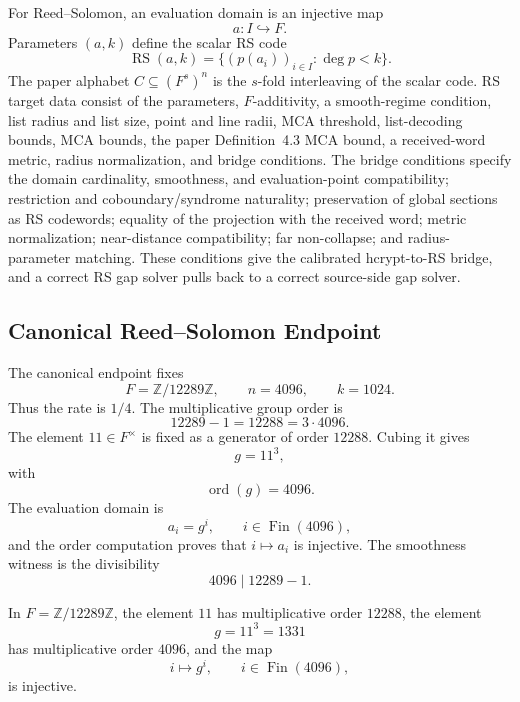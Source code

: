 For Reed--Solomon, an evaluation domain is an injective map
\[
  a:I\hookrightarrow F.
\]
Parameters \((a,k)\) define the scalar RS code
\[
  \operatorname{RS}(a,k)
  =
  \{(p(a_i))_{i\in I}:\deg p<k\}.
\]
The paper alphabet \(C\subseteq(F^s)^n\) is the \(s\)-fold interleaving of the
scalar code. RS target data consist of the parameters, \(F\)-additivity, a
smooth-regime condition, list radius and list size, point and line radii, MCA
threshold, list-decoding bounds, MCA bounds, the paper Definition~4.3 MCA
bound, a received-word metric, radius normalization, and bridge conditions.
The bridge conditions specify the domain cardinality, smoothness, and
evaluation-point compatibility; restriction and coboundary/syndrome
naturality; preservation of global sections as RS codewords; equality of the
projection with the received word; metric normalization; near-distance
compatibility; far non-collapse; and radius-parameter matching.
These conditions give the calibrated hcrypt-to-RS bridge, and a correct
RS gap solver pulls back to a correct source-side gap solver.

\subsection{Canonical Reed--Solomon Endpoint}\label{sec:rs-canonical-endpoint}

The canonical endpoint fixes
\[
  F=\mathbb Z/12289\mathbb Z,\qquad n=4096,\qquad k=1024.
\]
Thus the rate is \(1/4\). The multiplicative group order is
\[
  12289-1=12288=3\cdot4096.
\]
The element \(11\in F^\times\) is fixed as a generator of order \(12288\).
Cubing it gives
\[
  g=11^3,
\]
with
\[
  \operatorname{ord}(g)=4096.
\]
The evaluation domain is
\[
  a_i=g^i,\qquad i\in\operatorname{Fin}(4096),
\]
and the order computation proves that \(i\mapsto a_i\) is injective. The
smoothness witness is the divisibility
\[
  4096\mid 12289-1.
\]

\begin{proposition}\label{prop:canonical-power-domain}
In \(F=\mathbb Z/12289\mathbb Z\), the element \(11\) has multiplicative order
\(12288\), the element
\[
  g=11^3=1331
\]
has multiplicative order \(4096\), and the map
\[
  i\longmapsto g^i,\qquad i\in\operatorname{Fin}(4096),
\]
is injective.
\end{proposition}

